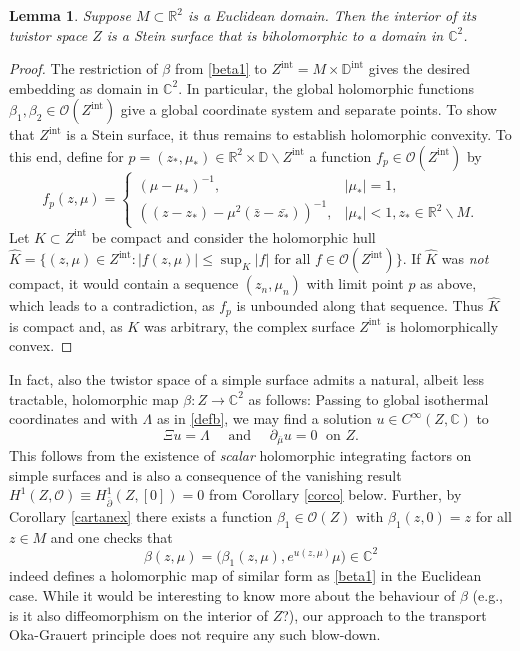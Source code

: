 \documentclass[JEP,XML,SOM,Unicode,published]{cedram}
\theoremstyle{plain}
\newtheorem{lemma}[theorem]{Lemma}
\theoremstyle{definition}
\newcommand{\R}{\mathbb{R}}
\newcommand{\C}{\mathbb{C}}
\newcommand{\DD}{\mathbb{D}}
\renewcommand{\O}{\mathcal{O}}
\newcommand{\interior}{\mathrm{int}}
\newcommand{\1}{{\bf 1}}
\begin{document}
\begin{lemma}\label{flatstein} Suppose $M\subset \R^2$ is a Euclidean domain. Then the interior of its twistor space $Z$ is a Stein surface that is biholomorphic to a domain in $\C^2$.
\end{lemma}

\begin{proof} The restriction of $\beta$ from \eqref{beta1} to $Z^\interior=M\times \DD^{\interior}$
gives the desired embedding as domain in $\C^2$. In particular, the global holomorphic functions $\beta_1,\beta_2\in \mathcal O(Z^\interior)$ give a global coordinate system and separate points. To show that $Z^\interior$ is a Stein surface,
it thus remains to establish holomorphic convexity. To this end, define for $p=(z_*,\mu_*)\in \R^2\times \DD\backslash Z^\interior$ a function $f_p\in \O(Z^\interior)$ by
\begin{equation*}
f_p(z,\mu)=
\begin{cases}
(\mu-\mu_*)^{-1}, & \vert \mu_*\vert =1,\\
\left ( (z-z_*)-\mu^2(\bar z -\bar {z_*})\right)^{-1}, & \vert \mu_* \vert<1, z_*\in \R^2\backslash M.
\end{cases}
\end{equation*}
Let $K\subset Z^\interior$ be compact and consider the holomorphic hull $\hat K =\{(z,\mu)\in Z^{\interior}: \vert f(z,\mu)\vert \le \sup_K \vert f \vert \text{ for all } f\in \O(Z^{\interior})\}$. If $\hat K$ was \emph{not} compact, it would contain a sequence $(z_n,\mu_n)$ with limit point $p$ as above, which leads to a contradiction, as $f_p$ is unbounded along that sequence. Thus $\hat K$ is compact and, as $K$ was arbitrary, the complex surface $Z^\interior$ is holomorphically convex.
\end{proof}

In fact, also the twistor space of a simple surface admits a natural, albeit less tractable, holomorphic map $\beta:Z\to \C^2$ as follows: Passing to global isothermal coordinates and with $\Lambda$ as in \eqref{defb}, we may find a solution $u\in C^\infty(Z,\C)$ to \begin{equation*}
\Xi u = \Lambda \quad \text{ and } \quad \partial_{\bar \mu}u =0\; \text{ on } Z.
\end{equation*}
This follows from the existence of \emph{scalar} holomorphic integrating factors on simple surfaces and is also a consequence of the vanishing result $H^1(Z,\mathcal{O})\equiv H^1_{\bar \partial}(Z,[0])=0$ from Corollary \ref{corco} below. Further, by Corollary \ref{cartanex} there exists a function $\beta_1\in \O(Z)$ with $\beta_1(z,0)=z$ for all $z\in M$ and one checks that
\begin{equation*}
\beta(z,\mu) = \bigl(\beta_1(z,\mu),e^{u(z,\mu)}\mu \bigr) \in \C^2
\end{equation*}
indeed defines a holomorphic map of similar form as \eqref{beta1} in the Euclidean case. While it would be interesting to know more about the behaviour of $\beta$ (e.g., is it also diffeomorphism on the interior of $Z$?), our approach to the transport Oka-Grauert principle does not require any such blow-down.
\end{document}
